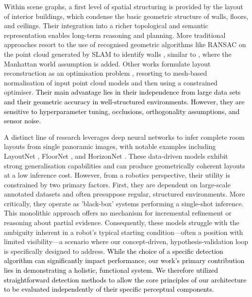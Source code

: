 \documentclass[10pt,a4paper]{article}
\begin{document}
Within scene graphs, a first level of spatial structuring is provided by the layout of interior buildings, which condense the basic geometric structure of walls, floors, and ceilings. Their integration into a richer topological and semantic representation enables long-term reasoning and planning.
More traditional approaches resort to the use of recognised geometric algorithms like RANSAC on the point cloud generated by SLAM to identify walls \cite{hossein2019building, 8206513, han2021vectorized}, similar to \cite{khanal2024structurepreservingplanarsimplificationindoor}, where the Manhattan world assumption is added. Other works formulate layout reconstruction as an optimisation problem \cite{rs14184675}, resorting to mesh-based normalisation of input point cloud models and then using a constrained optimiser. 
\textcolor{black}{Their main advantage lies in their independence from large data sets and their geometric accuracy in well-structured environments. However, they are sensitive to hyperparameter tuning, occlusions, orthogonality assumptions, and sensor noise.}

A distinct line of research leverages deep neural networks to infer complete room layouts from single panoramic images, with notable examples including LayoutNet \cite{zou2018layoutnet}, FloorNet \cite{liu2018floornet}, and HorizonNet \cite{Sun_2019_CVPR}. These data-driven models exhibit strong generalisation capabilities and can produce geometrically coherent layouts at a low inference cost. However, from a robotics perspective, their utility is constrained by two primary factors. First, they are dependent on large-scale annotated datasets and often presuppose regular, structured environments. More critically, they operate as 'black-box' systems performing a single-shot inference. This monolithic approach offers no mechanism for incremental refinement or reasoning about partial evidence. Consequently, these models struggle with the ambiguity inherent in a robot's typical starting condition—often a position with limited visibility—a scenario where our concept-driven, hypothesis-validation loop is specifically designed to address. \textcolor{black}{While the choice of a specific detection algorithm can significantly impact performance, our work's primary contribution lies in demonstrating a holistic, functional system. We therefore utilized straightforward detection methods to allow the core principles of our architecture to be evaluated independently of their specific perceptual components.}
\end{document}
